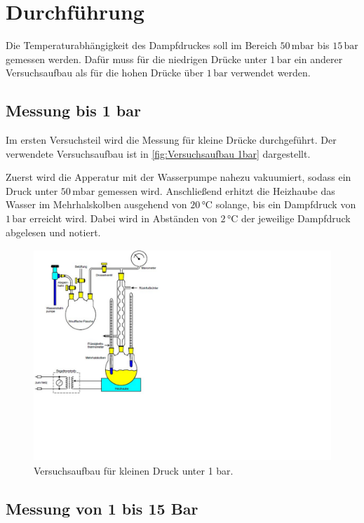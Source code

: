 \section{Durchführung}
\label{sec:Durchführung}

Die Temperaturabhängigkeit des Dampfdruckes soll im Bereich $50\,\unit{\milli\bar}$ bis $15\,\unit{\bar}$
gemessen werden.
Dafür muss für die niedrigen Drücke unter $1\,\unit{\bar}$ ein anderer Versuchsaufbau als für die hohen
Drücke über $1\,\unit{\bar}$ verwendet werden.

\subsection{Messung bis 1 bar}
\label{sec:Messung bis 1 bar}

Im ersten Versuchsteil wird die Messung für kleine Drücke durchgeführt.
Der verwendete Versuchsaufbau ist in \autoref{fig:Versuchsaufbau 1bar} dargestellt.

Zuerst wird die Apperatur mit der Wasserpumpe nahezu vakuumiert, sodass ein Druck unter $50\,\unit{\milli\bar}$ gemessen wird.
Anschließend erhitzt die Heizhaube das Wasser im Mehrhalskolben ausgehend von $20\,\unit{\celsius}$ solange, bis ein Dampfdruck
von $1\,\unit{\bar}$ erreicht wird.
Dabei wird in Abständen von $2\,\unit{\celsius}$ der jeweilige Dampfdruck abgelesen und notiert.

\begin{figure} [H]
    \centering
    \includegraphics[height=8cm]{content/Bilder/Versuchsaufbau_1bar.pdf}
    \caption{Versuchsaufbau für kleinen Druck unter 1 bar. \cite{v203}}
    \label{fig:Versuchsaufbau 1bar}
\end{figure}

\subsection{Messung von 1 bis 15 Bar}
\label{sec:Messung von 1 bis 15 Bar}

